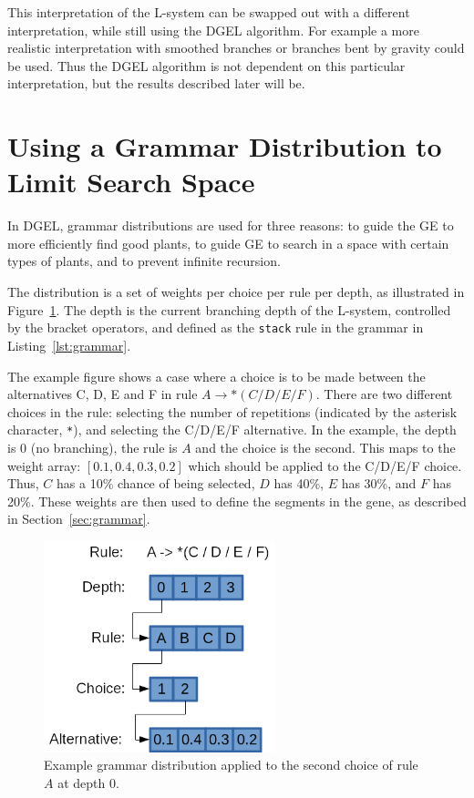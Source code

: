 This interpretation of the L-system can be swapped out with a different interpretation, while still using the DGEL algorithm.
For example a more realistic interpretation with smoothed branches or branches bent by gravity could be used.
Thus the DGEL algorithm is not dependent on this particular interpretation, but the results described later will be.

\section{Using a Grammar Distribution to Limit Search Space}
In DGEL, grammar distributions are used for three reasons: to guide the GE to more efficiently find good plants, to guide GE to search in a space with certain types of plants, and to prevent infinite recursion.

The distribution is a set of weights per choice per rule per depth, as illustrated in Figure~\ref{fig:distribution}.
The depth is the current branching depth of the L-system, controlled by the bracket operators, and defined as the \texttt{stack} rule in the grammar in Listing~\ref{lst:grammar}.

The example figure shows a case where a choice is to be made between the alternatives C, D, E and F in rule $A \rightarrow *(C / D / E / F)$.
There are two different choices in the rule: selecting the number of repetitions (indicated by the asterisk character, \texttt{*}), and selecting the C/D/E/F alternative.
In the example, the depth is 0 (no branching), the rule is $A$ and the choice is the second.
This maps to the weight array: $[0.1, 0.4, 0.3, 0.2]$ which should be applied to the C/D/E/F choice.
Thus, $C$ has a 10\% chance of being selected, $D$ has 40\%, $E$ has 30\%, and $F$ has 20\%.
These weights are then used to define the segments in the gene, as described in Section~\ref{sec:grammar}.

\begin{figure}
    \centering
    \includegraphics[width=0.6\textwidth]{figures/distribution}
    \caption[Example grammar distribution]{Example grammar distribution applied to the second choice of rule $A$ at depth 0.}
    \label{fig:distribution}
\end{figure}

